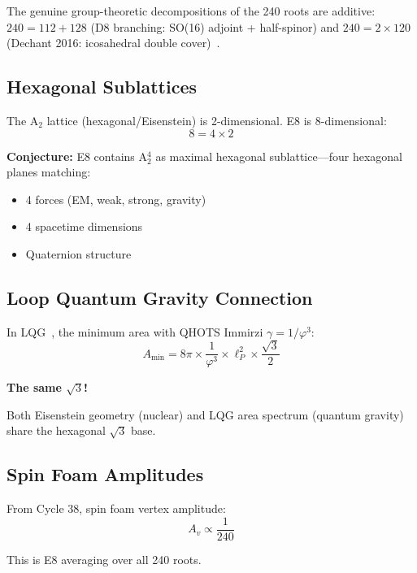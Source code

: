 \documentclass[aps,prd,twocolumn,superscriptaddress,floatfix,nofootinbib]{revtex4-2}
\theoremstyle{definition}
\theoremstyle{remark}
\newcommand{\vp}{\varphi}
\begin{document}
The genuine group-theoretic decompositions of the 240 roots are additive:
$240 = 112 + 128$ (D8 branching: SO(16) adjoint + half-spinor) and
$240 = 2 \times 120$ (Dechant 2016: icosahedral double cover)~\cite{dechant}.

\subsection{Hexagonal Sublattices}

The A$_2$ lattice (hexagonal/Eisenstein) is 2-dimensional. E8 is 8-dimensional:
\begin{equation}
8 = 4 \times 2
\end{equation}

\textbf{Conjecture:} E8 contains A$_2^4$ as maximal hexagonal sublattice---four hexagonal planes matching:
\begin{itemize}
\item 4 forces (EM, weak, strong, gravity)
\item 4 spacetime dimensions
\item Quaternion structure
\end{itemize}

\subsection{Loop Quantum Gravity Connection}

In LQG~\cite{lqg}, the minimum area with QHOTS Immirzi $\gamma = 1/\vp^3$:
\begin{equation}
A_{\min} = 8\pi \times \frac{1}{\vp^3} \times \ell_P^2 \times \frac{\sqrt{3}}{2}
\end{equation}

\textbf{The same $\sqrt{3}$!}

Both Eisenstein geometry (nuclear) and LQG area spectrum (quantum gravity) share the hexagonal $\sqrt{3}$ base.

\subsection{Spin Foam Amplitudes}

From Cycle 38, spin foam vertex amplitude:
\begin{equation}
A_v \propto \frac{1}{240}
\end{equation}

This is E8 averaging over all 240 roots.

\end{document}
